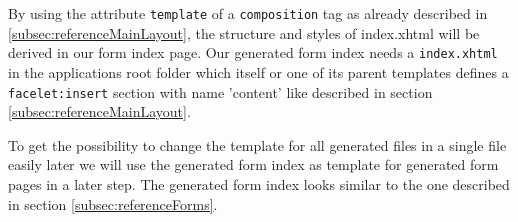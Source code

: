 By using the attribute \texttt{template} of a \texttt{composition} tag as
already described in \ref{subsec:referenceMainLayout}, the structure and styles of
index.xhtml will be derived in our form index page. Our generated form index
needs a \texttt{index.xhtml} in the applications root folder which itself or one of its
parent templates defines a \texttt{facelet:insert} section with name 'content'
like described in section \ref{subsec:referenceMainLayout}.

To get the possibility to change the template for all generated files in
a single file easily later we will use the generated form index as template for
generated form pages in a later step. The generated form index looks similar to
the one described in section \ref{subsec:referenceForms}.
